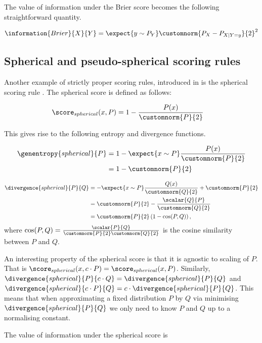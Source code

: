 The value of information under the Brier score becomes the following straightforward quantity.

\begin{align}
	\information{Brier}{X}{Y} &= \expect{y \sim P_{Y}} \customnorm{P_X - P_{X\vert Y=y}}{2}^2\\
\end{align}

\subsection{Spherical and pseudo-spherical scoring rules}
Another example of strictly proper scoring rules, introduced in \citep{Good1971} is the spherical scoring rule \citep{Dawid2007,Dawid2012}. The spherical score is defined as follows:

\begin{align}
	\score_{spherical}(x,P) &= 1 -\frac{P(x)}{\customnorm{P}{2}}
\end{align}

This gives rise to the following entropy and divergence functions.

\begin{align}
	\genentropy{spherical}{P} &= 1 -\expect{x \sim P}\frac{P(x)}{\customnorm{P}{2}}\\
		&= 1 -\customnorm{P}{2}
\end{align}

\begin{align}
	\divergence{spherical}{P}{Q} &= -\expect{x \sim P}\frac{Q(x)}{\customnorm{Q}{2}} + \customnorm{P}{2}\\
		&= \customnorm{P}{2} - \frac{\scalar{Q}{P}}{\customnorm{Q}{2}}\\
		&= \customnorm{P}{2}\left( 1 - \cos(P,Q) \right),
\end{align}
where $\cos(P,Q) = \frac{\scalar{P}{Q}}{\customnorm{P}{2}\customnorm{Q}{2}}$ is the cosine similarity between $P$ and $Q$.

An interesting property of the spherical score is that it is agnostic to scaling of $P$. That is $\score_{spherical}(x,c\cdot P) = \score_{spherical}(x,P) $. Similarly, $\divergence{spherical}{P}{c\cdot Q} = \divergence{spherical}{P}{Q}$ and $\divergence{spherical}{c\cdot P}{Q} = c \cdot \divergence{spherical}{P}{Q}$. This means that when approximating a fixed distribution $P$ by $Q$ via minimising $\divergence{spherical}{P}{Q}$ we only need to know $P$ and $Q$ up to a normalising constant.

The value of information under the spherical score is

